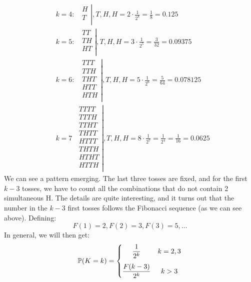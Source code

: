 \newpage\noindent
\begin{align*}
    &k=4:\;\;
    \left.
    \begin{matrix} 
        H \\ 
        T \\ 
    \end{matrix}
    \right|,T, H, H
    = 2\cdot \frac{1}{2^4} = \frac{1}{8} = 0.125\\
    &k=5:\;\;
    \left.
    \begin{matrix} 
        TT \\ 
        TH \\ 
        HT \\ 
    \end{matrix}
    \right|,T, H, H
    = 3\cdot \frac{1}{2^5} = \frac{3}{32} = 0.09375\\
    &k=6:\;\;
    \left.
    \begin{matrix} 
        TTT \\ 
        TTH \\ 
        THT \\ 
        HTT \\ 
        HTH \\ 
    \end{matrix}
    \right|,T, H, H
    = 5\cdot \frac{1}{2^6} = \frac{5}{64} = 0.078125 \\
    &k=7\;\;
    \left.
    \begin{matrix} 
        TTTT \\ 
        TTTH \\ 
        TTHT \\ 
        THTT \\ 
        HTTT \\ 
        THTH \\ 
        HTHT \\ 
        HTTH \\ 
    \end{matrix}
    \right|,T, H, H
    = 8\cdot \frac{1}{2^7} = \frac{1}{2^4} = \frac{1}{16} = 0.0625
\end{align*}
We can see a pattern emerging. The last three tosses are fixed, and for the first $k-3$ tosses, we have to count
all the combinations that do not contain 2 simultaneous H. The details are quite interesting, and it turns out
that the number in the $k-3$ first tosses follows the Fibonacci sequence (as we can see above). Defining:
$$
F(1) = 2, F(2) = 3, F(3) = 5, \ldots
$$
In general, we will then get:
$$
\P(K=k) =
\left\{
    \begin{matrix}
        \displaystyle\frac{1}{2^k} & k = 2,3 \\
        \rule{0pt}{22pt}\displaystyle\frac{F(k-3)}{2^k} & k > 3
    \end{matrix}
\right.
$$

